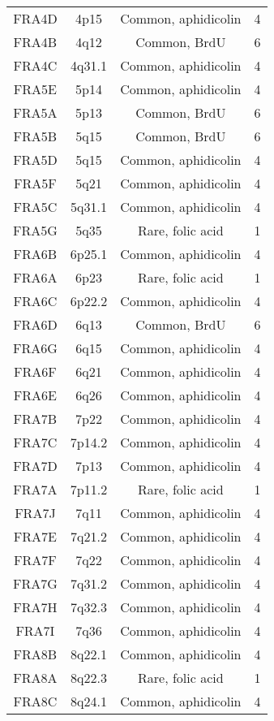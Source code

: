 \begin{center}
\begin{longtable}{cccc}
FRA4D  & 4p15     & Common, aphidicolin   & 4 \\
FRA4B  & 4q12     & Common, BrdU          & 6 \\
FRA4C  & 4q31.1   & Common, aphidicolin   & 4 \\
FRA5E  & 5p14     & Common, aphidicolin   & 4 \\
FRA5A  & 5p13     & Common, BrdU          & 6 \\
FRA5B  & 5q15     & Common, BrdU          & 6 \\
FRA5D  & 5q15     & Common, aphidicolin   & 4 \\
FRA5F  & 5q21     & Common, aphidicolin   & 4 \\
FRA5C  & 5q31.1   & Common, aphidicolin   & 4 \\
FRA5G  & 5q35     & Rare, folic acid      & 1 \\
FRA6B  & 6p25.1   & Common, aphidicolin   & 4 \\
FRA6A  & 6p23     & Rare, folic acid      & 1 \\
FRA6C  & 6p22.2   & Common, aphidicolin   & 4 \\
FRA6D  & 6q13     & Common, BrdU          & 6 \\
FRA6G  & 6q15     & Common, aphidicolin   & 4 \\
FRA6F  & 6q21     & Common, aphidicolin   & 4 \\
FRA6E  & 6q26     & Common, aphidicolin   & 4 \\
FRA7B  & 7p22     & Common, aphidicolin   & 4 \\
FRA7C  & 7p14.2   & Common, aphidicolin   & 4 \\
FRA7D  & 7p13     & Common, aphidicolin   & 4 \\
FRA7A  & 7p11.2   & Rare, folic acid      & 1 \\
FRA7J  & 7q11     & Common, aphidicolin   & 4 \\
FRA7E  & 7q21.2   & Common, aphidicolin   & 4 \\
FRA7F  & 7q22     & Common, aphidicolin   & 4 \\
FRA7G  & 7q31.2   & Common, aphidicolin   & 4 \\
FRA7H  & 7q32.3   & Common, aphidicolin   & 4 \\
FRA7I  & 7q36     & Common, aphidicolin   & 4 \\
FRA8B  & 8q22.1   & Common, aphidicolin   & 4 \\
FRA8A  & 8q22.3   & Rare, folic acid      & 1 \\
FRA8C  & 8q24.1   & Common, aphidicolin   & 4 \\

\end{longtable}
\end{center}
